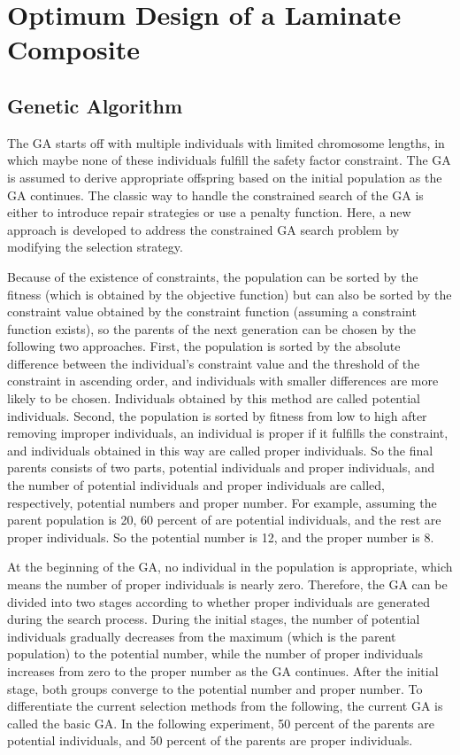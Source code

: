 \documentclass[USenglish]{article}
\begin{document}
\section{Optimum Design of a Laminate Composite}


\subsection{Genetic Algorithm}
The GA starts off with multiple individuals with limited chromosome lengths, in which maybe none of
these individuals fulfill the safety factor constraint. The GA is assumed to derive appropriate
offspring based on the initial population as the GA continues. The classic way to handle the constrained
search of the GA is either to introduce repair strategies or use a penalty function. Here, a new
approach is developed to address the constrained GA search problem by modifying the selection
strategy.

Because of the existence of constraints, the population can be sorted by the
fitness (which is obtained by the objective function) but can also be sorted by the constraint value
obtained by the constraint function (assuming a constraint function exists), so the parents of the next
generation can be chosen by the following two approaches. First, the population is sorted by the
absolute difference between the individual's constraint value and the threshold of the constraint in
ascending order, and individuals with smaller differences are more likely to be chosen. Individuals
obtained by this method are called potential individuals. Second, the population is sorted by fitness
from low to high after removing improper individuals, an individual is proper if it
fulfills the constraint, and individuals obtained in this way are called proper individuals. So the
final parents consists of two parts, potential individuals and proper individuals, and the number of
potential individuals and proper individuals are called, respectively, potential numbers and proper
number. For example, assuming the parent population is 20, 60 percent of are potential
individuals, and the rest are proper individuals. So the potential number is 12, and the proper
number is 8.

At the beginning of the GA, no individual in the population is appropriate, which means the number
of proper individuals is nearly zero. Therefore, the GA can be divided into two stages according to whether
proper individuals are generated during the search process. During the initial stages, the number of
potential individuals gradually decreases from the maximum (which is the parent population) to the potential
number, while the number of proper individuals increases from zero to the proper number as the GA
continues. After the initial stage, both groups converge to the
potential number and proper number. To differentiate the current selection methods from
the following, the current GA is called the basic GA. In the following experiment, 50 percent of the
parents are potential individuals, and 50 percent of the parents are proper individuals.
\end{document}
